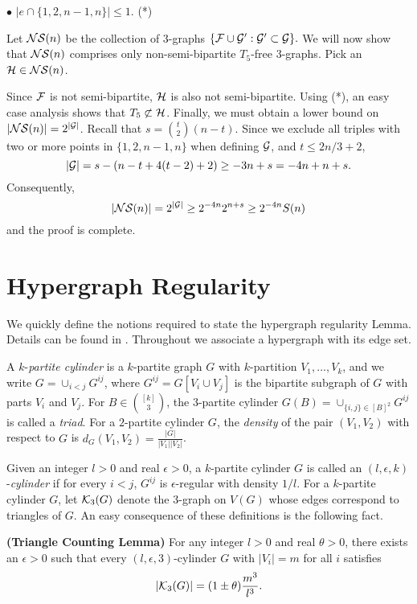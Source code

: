 \documentclass[11pt]{article}
\begin{document}
$\bullet$  $|e \cap \{1,2,n-1,n\}| \le 1$. \quad (*)

Let $\mathcal{N}\mathcal{S}(n)$ be
the collection of 3-graphs
$\{{\cal F} \cup {\cal G}': {\cal G}' \subset {\cal G}\}.$
 We will now show that $\mathcal{N}\mathcal{S}(n)$ comprises only non-semi-bipartite $T_5$-free 3-graphs.
 Pick an $\mathcal{H} \in \mathcal{N}\mathcal{S}(n)$.

Since ${\cal F}$ is not semi-bipartite, $\mathcal{H}$ is also not
semi-bipartite. Using (*), an easy case analysis shows that $T_5
\not\subset \mathcal{H}$. Finally, we must obtain a lower bound on
$|\mathcal{N}\mathcal{S}(n)|=2^{|{\cal G}|}$.  Recall that $s={t \choose 2}(n-t)$.
Since we exclude all triples with two or more points in
$\{1,2,n-1,n\}$ when defining $\cal G$, and $t \le 2n/3+2$,
$$|{\cal G}| =s-(n-t+4(t-2)+2)\ge -3n+s=-4n+n+s.$$
Consequently,
$$|\mathcal{N}\mathcal{S}(n)|=2^{|{\cal G}|}\ge 2^{-4n} 2^{n+s}\ge 2^{-4n} S(n)$$
and the proof is complete.


\section{Hypergraph Regularity}\label{hypreg}

We quickly define the notions required to state the hypergraph
regularity Lemma.  Details can be found in \cite{NR}.  Throughout we
associate a hypergraph with its edge set.

A $k$-{\it partite cylinder} is a $k$-partite graph $G$ with
$k$-partition $V_1, \ldots, V_k$, and we write $G=\cup_{i<j}
G^{ij}$, where $G^{ij}=G[V_i \cup V_j]$ is the bipartite subgraph
 of $G$ with parts $V_i$ and $V_j$.
 For $B \in \binom{[k]}{3}$, the $3$-partite cylinder $G(B)=\cup_{\{i,j\} \in [B]^2} G^{ij}$ is called a {\it triad}.
  For a $2$-partite cylinder $G$,
 the {\it density} of the pair $(V_1, V_2)$ with respect to $G$ is $d_G(V_1, V_2)=\frac{|G|}{|V_1||V_2|}$.

Given  an integer $l>0$ and real $\epsilon>0$, a $k$-partite
cylinder $G$ is called an $(l, \epsilon, k)$-{\it cylinder} if for
every $i<j$, $G^{ij}$ is $\epsilon$-regular with density $1/l$.
 For a $k$-partite cylinder $G$, let ${\cal K}_3(G)$ denote the
 $3$-graph on $V(G)$ whose edges correspond to triangles of $G$. An easy
consequence of these definitions is the following fact.

\begin{lemma} {\bf (Triangle Counting Lemma)}  \label{tlemma} For any integer $l>0$ and  real $\theta>0$,
 there exists an $\epsilon>0$ such that every $(l,\epsilon,3)$-cylinder $G$ with $|V_i|=m$ for all $i$ satisfies
$$|{\cal K}_3(G)| =(1\pm \theta)\frac{m^3}{l^3}.$$
\end{lemma}
\end{document}
